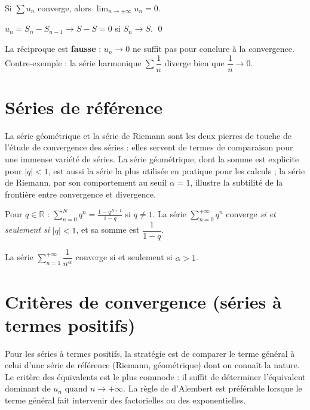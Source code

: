 \documentclass[11pt,a4paper,twoside]{book}
\newcommand{\R}{\mathbb{R}}
\begin{document}
\begin{theoremebox}
Si $\sum u_n$ converge, alors $\lim_{n\to+\infty} u_n = 0$.
\end{theoremebox}

\begin{preuvebox}
$u_n = S_n - S_{n-1} \to S - S = 0$ si $S_n \to S$. \qed
\end{preuvebox}

\begin{erreurbox}
La réciproque est \textbf{fausse} : $u_n \to 0$ ne suffit pas pour conclure à la convergence.
Contre-exemple : la série harmonique $\sum \dfrac{1}{n}$ diverge bien que $\dfrac{1}{n} \to 0$.
\end{erreurbox}

\section{Séries de référence}

La série géométrique et la série de Riemann sont les deux pierres de touche de l'étude de convergence des séries : elles servent de termes de comparaison pour une immense variété de séries. La série géométrique, dont la somme est explicite pour $|q| < 1$, est aussi la série la plus utilisée en pratique pour les calculs ; la série de Riemann, par son comportement au seuil $\alpha = 1$, illustre la subtilité de la frontière entre convergence et divergence.

\begin{theoremebox}
Pour $q \in \R$ : $\displaystyle\sum_{n=0}^{N} q^n = \frac{1-q^{N+1}}{1-q}$ si $q \neq 1$.
La série $\sum_{n=0}^{+\infty} q^n$ converge \emph{si et seulement si} $|q| < 1$,
et sa somme est $\dfrac{1}{1-q}$.
\end{theoremebox}

\begin{theoremebox}
La série $\sum_{n=1}^{+\infty} \dfrac{1}{n^\alpha}$ converge si et seulement si $\alpha > 1$.
\end{theoremebox}

\section{Critères de convergence (séries à termes positifs)}

Pour les séries à termes positifs, la stratégie est de comparer le terme général à celui d'une série de référence (Riemann, géométrique) dont on connaît la nature. Le critère des équivalents est le plus commode : il suffit de déterminer l'équivalent dominant de $u_n$ quand $n \to +\infty$. La règle de d'Alembert est préférable lorsque le terme général fait intervenir des factorielles ou des exponentielles.
\end{document}
